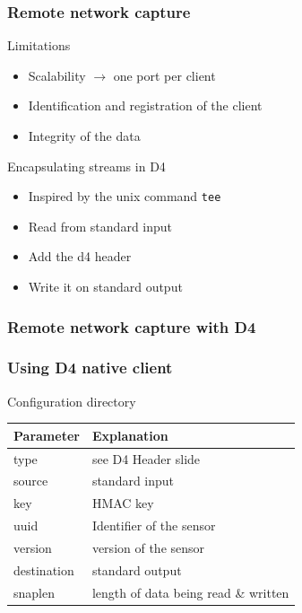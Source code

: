 \documentclass{beamer}
\begin{document}
\begin{frame}
    \frametitle{Remote network capture}
    \begin{block}{Limitations}
        \begin{itemize}
            \item Scalability $\to$ one port per client
            \item Identification and registration of the client
            \item Integrity of the data
        \end{itemize}
    \end{block}

    \begin{block}{Encapsulating streams in D4}
        \begin{itemize}
            \item Inspired by the unix command {\tt tee}
            \item Read from standard input
            \item Add the d4 header
            \item Write it on standard output
        \end{itemize}
    \end{block}
\end{frame}


\begin{frame}
    \frametitle{Remote network capture with D4}
    \frametitle{Using D4 native client}
    

\begin{block}{Configuration directory}
    \begin{tabular}{l|l}
        Parameter & Explanation\\
        \hline
        type & see D4 Header slide\\
        source & standard input\\
        key & HMAC key\\
        uuid & Identifier of the sensor\\
        version &  version of the sensor\\
        destination & standard output\\
        snaplen & length of data being read \& written\\
    \end{tabular}
\end{block}
\end{frame}
\end{document}
